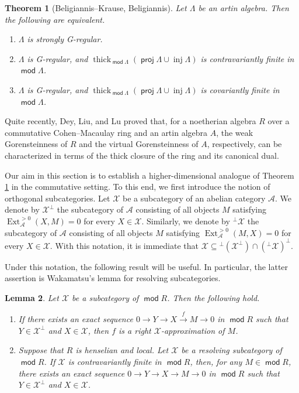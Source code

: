 \documentclass{amsart}
\newtheorem{thm}{Theorem}[section]
\newtheorem{lem}[thm]{Lemma}
\theoremstyle{definition}
\theoremstyle{remark}
\numberwithin{equation}{thm}
\def\Ext{\operatorname{Ext}}
\def\inj{\operatorname{inj}}
\def\mod{\operatorname{\mathsf{mod}}}
\def\proj{\operatorname{\mathsf{proj}}}
\def\thick{\operatorname{thick}}
\def\X{\mathcal{X}}
\begin{document}
\begin{thm}[Beligiannis--Krause, Beligiannis]\label{BKB}
Let $\Lambda$ be an artin algebra. Then the following are equivalent.
\begin{enumerate}[\rm(1)]
\item $\Lambda$ is strongly G-regular.
\item $\Lambda$ is G-regular, and $\thick_{\mod\Lambda}(\proj\Lambda\cup\inj\Lambda)$ is contravariantly finite in $\mod\Lambda$.
\item $\Lambda$ is G-regular, and $\thick_{\mod\Lambda}(\proj\Lambda\cup\inj\Lambda)$ is covariantly finite in $\mod\Lambda$.
\end{enumerate}
\end{thm}

Quite recently, Dey, Liu, and Lu \cite{DLL26} proved that, for a noetherian algebra $R$ over a commutative Cohen--Macaulay ring and an artin algebra $A$, the weak Gorensteinness of $R$ and the virtual Gorensteinness of $A$, respectively, can be characterized in terms of the thick closure of the ring and its canonical dual.

Our aim in this section is to establish a higher-dimensional analogue of Theorem \ref{BKB} in the commutative setting.
To this end, we first introduce the notion of orthogonal subcategories.
Let $\X$ be a subcategory of an abelian category $\mathcal{A}$. We denote by $\X^{\perp}$ the subcategory of $\mathcal{A}$ consisting of all objects $M$ satisfying $\Ext_{\mathcal{A}}^{>0}(X,M)=0$ for every $X\in\X$. Similarly, we denote by ${}^{\perp}\X$ the subcategory of $\mathcal{A}$ consisting of all objects $M$ satisfying $\Ext_{\mathcal{A}}^{>0}(M,X)=0$ for every $X\in\X$.
With this notation, it is immediate that $\X\subseteq {}^{\perp}(\X^{\perp})\cap({}^{\perp}\X)^{\perp}$.

Under this notation, the following result will be useful. In particular, the latter assertion is Wakamatsu's lemma \cite{AR91, Wak} for resolving subcategories.

\begin{lem}\label{wak}
Let $\X$ be a subcategory of $\mod R$.
Then the following hold.
\begin{enumerate}[\rm(1)]
\item  If there exists an exact sequence $0\to Y\to X\xrightarrow{f}M\to 0$ in $\mod R$ such that $Y\in\X^\perp$ and $X\in\X$, then $f$ is a right $\X$-approximation of $M$.
\item  Suppose that $R$ is henselian and local. Let $\X$ be a resolving subcategory of $\mod R$. If $\X$ is contravariantly finite in $\mod R$, then, for any $M\in\mod R$, there exists an exact sequence $0\to Y\to X\to M\to 0$ in $\mod R$ such that $Y\in\X^{\perp}$ and $X\in\X$.
\end{enumerate}
\end{lem}
\end{document}

